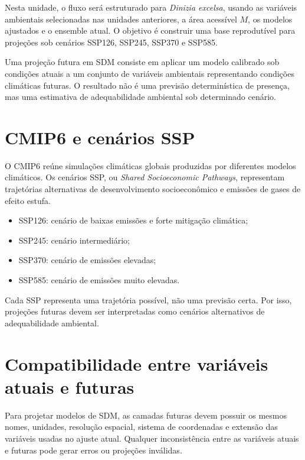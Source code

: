 \documentclass{ueap-sdm}
\begin{document}
Nesta unidade, o fluxo será estruturado para \textit{Dinizia excelsa}, usando as variáveis ambientais selecionadas nas unidades anteriores, a área acessível \(M\), os modelos ajustados e o ensemble atual. O objetivo é construir uma base reprodutível para projeções sob cenários SSP126, SSP245, SSP370 e SSP585.

\begin{conceito}[title={\faBook\quad Projeção climática futura}]
	Uma projeção futura em SDM consiste em aplicar um modelo calibrado sob condições atuais a um conjunto de variáveis ambientais representando condições climáticas futuras. O resultado não é uma previsão determinística de presença, mas uma estimativa de adequabilidade ambiental sob determinado cenário.
\end{conceito}

\section{CMIP6 e cenários SSP}

O CMIP6 reúne simulações climáticas globais produzidas por diferentes modelos climáticos. Os cenários SSP, ou \textit{Shared Socioeconomic Pathways}, representam trajetórias alternativas de desenvolvimento socioeconômico e emissões de gases de efeito estufa.

\begin{itemize}
	\item SSP126: cenário de baixas emissões e forte mitigação climática;
	\item SSP245: cenário intermediário;
	\item SSP370: cenário de emissões elevadas;
	\item SSP585: cenário de emissões muito elevadas.
\end{itemize}

\begin{atencao}[title={\faExclamationTriangle\quad Cenário não é previsão única}]
	Cada SSP representa uma trajetória possível, não uma previsão certa. Por isso, projeções futuras devem ser interpretadas como cenários alternativos de adequabilidade ambiental.
\end{atencao}

\section{Compatibilidade entre variáveis atuais e futuras}

Para projetar modelos de SDM, as camadas futuras devem possuir os mesmos nomes, unidades, resolução espacial, sistema de coordenadas e extensão das variáveis usadas no ajuste atual. Qualquer inconsistência entre as variáveis atuais e futuras pode gerar erros ou projeções inválidas.
\end{document}
